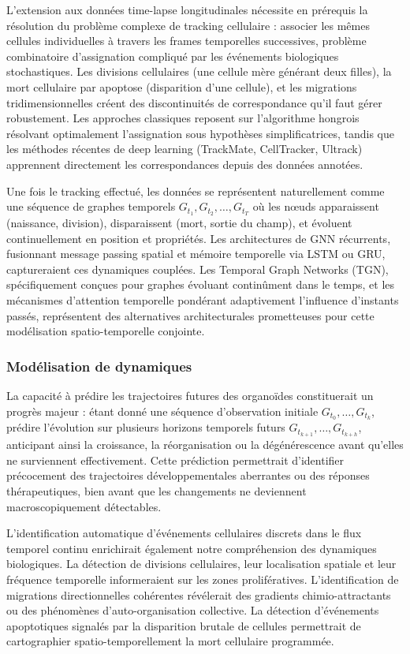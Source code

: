 L'extension aux données time-lapse longitudinales nécessite en prérequis la résolution du problème complexe de tracking cellulaire : associer les mêmes cellules individuelles à travers les frames temporelles successives, problème combinatoire d'assignation compliqué par les événements biologiques stochastiques. Les divisions cellulaires (une cellule mère générant deux filles), la mort cellulaire par apoptose (disparition d'une cellule), et les migrations tridimensionnelles créent des discontinuités de correspondance qu'il faut gérer robustement. Les approches classiques reposent sur l'algorithme hongrois résolvant optimalement l'assignation sous hypothèses simplificatrices, tandis que les méthodes récentes de deep learning (TrackMate, CellTracker, Ultrack) apprennent directement les correspondances depuis des données annotées.

Une fois le tracking effectué, les données se représentent naturellement comme une séquence de graphes temporels $G_{t_1}, G_{t_2}, \ldots, G_{t_T}$ où les nœuds apparaissent (naissance, division), disparaissent (mort, sortie du champ), et évoluent continuellement en position et propriétés. Les architectures de GNN récurrents, fusionnant message passing spatial et mémoire temporelle via LSTM ou GRU, captureraient ces dynamiques couplées. Les Temporal Graph Networks (TGN), spécifiquement conçues pour graphes évoluant continûment dans le temps, et les mécanismes d'attention temporelle pondérant adaptivement l'influence d'instants passés, représentent des alternatives architecturales prometteuses pour cette modélisation spatio-temporelle conjointe.

\subsubsection{Modélisation de dynamiques}

La capacité à prédire les trajectoires futures des organoïdes constituerait un progrès majeur : étant donné une séquence d'observation initiale $G_{t_0}, \ldots, G_{t_k}$, prédire l'évolution sur plusieurs horizons temporels futurs $G_{t_{k+1}}, \ldots, G_{t_{k+h}}$, anticipant ainsi la croissance, la réorganisation ou la dégénérescence avant qu'elles ne surviennent effectivement. Cette prédiction permettrait d'identifier précocement des trajectoires développementales aberrantes ou des réponses thérapeutiques, bien avant que les changements ne deviennent macroscopiquement détectables.

L'identification automatique d'événements cellulaires discrets dans le flux temporel continu enrichirait également notre compréhension des dynamiques biologiques. La détection de divisions cellulaires, leur localisation spatiale et leur fréquence temporelle informeraient sur les zones prolifératives. L'identification de migrations directionnelles cohérentes révélerait des gradients chimio-attractants ou des phénomènes d'auto-organisation collective. La détection d'événements apoptotiques signalés par la disparition brutale de cellules permettrait de cartographier spatio-temporellement la mort cellulaire programmée.

